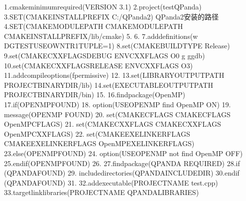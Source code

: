 \documentclass[a4paper,11pt,english]{sphinxmanual}
\begin{document}
\begin{sphinxVerbatim}[commandchars=\\\{\}]
1.cmake\PYGZus{}minimum\PYGZus{}required(VERSION 3.1)
2.project(testQPanda)
3.SET(CMAKE\PYGZus{}INSTALL\PYGZus{}PREFIX  \PYGZdq{}C:/QPanda2\PYGZdq{}) \PYGZsh{} QPanda2安装的路径
4.SET(CMAKE\PYGZus{}MODULE\PYGZus{}PATH \PYGZdl{}\PYGZob{}CMAKE\PYGZus{}MODULE\PYGZus{}PATH\PYGZcb{} \PYGZdq{}\PYGZdl{}\PYGZob{}CMAKE\PYGZus{}INSTALL\PYGZus{}PREFIX\PYGZcb{}/lib/cmake\PYGZdq{})
5.
6.
7.add\PYGZus{}definitions(\PYGZdq{}\PYGZhy{}w \PYGZhy{}DGTEST\PYGZus{}USE\PYGZus{}OWN\PYGZus{}TR1\PYGZus{}TUPLE=1\PYGZdq{})
8.set(CMAKE\PYGZus{}BUILD\PYGZus{}TYPE \PYGZdq{}Release\PYGZdq{})
9.set(CMAKE\PYGZus{}CXX\PYGZus{}FLAGS\PYGZus{}DEBUG \PYGZdq{}\PYGZdl{}ENV\PYGZob{}CXXFLAGS\PYGZcb{} \PYGZhy{}O0 \PYGZhy{}g \PYGZhy{}ggdb\PYGZdq{})
10.set(CMAKE\PYGZus{}CXX\PYGZus{}FLAGS\PYGZus{}RELEASE \PYGZdq{}\PYGZdl{}ENV\PYGZob{}CXXFLAGS\PYGZcb{} \PYGZhy{}O3\PYGZdq{})
11.add\PYGZus{}compile\PYGZus{}options(\PYGZhy{}fpermissive)
12.
13.set(LIBRARY\PYGZus{}OUTPUT\PYGZus{}PATH \PYGZdl{}\PYGZob{}PROJECT\PYGZus{}BINARY\PYGZus{}DIR\PYGZcb{}/lib)
14.set(EXECUTABLE\PYGZus{}OUTPUT\PYGZus{}PATH \PYGZdl{}\PYGZob{}PROJECT\PYGZus{}BINARY\PYGZus{}DIR\PYGZcb{}/bin)
15.
16.find\PYGZus{}package(OpenMP)
17.if(OPENMP\PYGZus{}FOUND)
18.    option(USE\PYGZus{}OPENMP \PYGZdq{}find OpenMP\PYGZdq{} ON)
19.    message(\PYGZdq{}OPENMP FOUND\PYGZdq{})
20.    set(CMAKE\PYGZus{}C\PYGZus{}FLAGS \PYGZdq{}\PYGZdl{}\PYGZob{}CMAKE\PYGZus{}C\PYGZus{}FLAGS\PYGZcb{} \PYGZdl{}\PYGZob{}OpenMP\PYGZus{}C\PYGZus{}FLAGS\PYGZcb{}\PYGZdq{})
21.    set(CMAKE\PYGZus{}CXX\PYGZus{}FLAGS \PYGZdq{}\PYGZdl{}\PYGZob{}CMAKE\PYGZus{}CXX\PYGZus{}FLAGS\PYGZcb{} \PYGZdl{}\PYGZob{}OpenMP\PYGZus{}CXX\PYGZus{}FLAGS\PYGZcb{}\PYGZdq{})
22.    set(CMAKE\PYGZus{}EXE\PYGZus{}LINKER\PYGZus{}FLAGS \PYGZdq{}\PYGZdl{}\PYGZob{}CMAKE\PYGZus{}EXE\PYGZus{}LINKER\PYGZus{}FLAGS\PYGZcb{} \PYGZdl{}\PYGZob{}OpenMP\PYGZus{}EXE\PYGZus{}LINKER\PYGZus{}FLAGS\PYGZcb{}\PYGZdq{})
23.else(OPENMP\PYGZus{}FOUND)
24.    option(USE\PYGZus{}OPENMP \PYGZdq{}not find OpenMP\PYGZdq{} OFF)
25.endif(OPENMP\PYGZus{}FOUND)
26.
27.find\PYGZus{}package(QPANDA REQUIRED)
28.if (QPANDA\PYGZus{}FOUND)
29.    include\PYGZus{}directories(\PYGZdl{}\PYGZob{}QPANDA\PYGZus{}INCLUDE\PYGZus{}DIR\PYGZcb{})
30.endif (QPANDA\PYGZus{}FOUND)
31.
32.add\PYGZus{}executable(\PYGZdl{}\PYGZob{}PROJECT\PYGZus{}NAME\PYGZcb{} test.cpp)
33.target\PYGZus{}link\PYGZus{}libraries(\PYGZdl{}\PYGZob{}PROJECT\PYGZus{}NAME\PYGZcb{} \PYGZdl{}\PYGZob{}QPANDA\PYGZus{}LIBRARIES\PYGZcb{})
\end{sphinxVerbatim}
\end{document}
